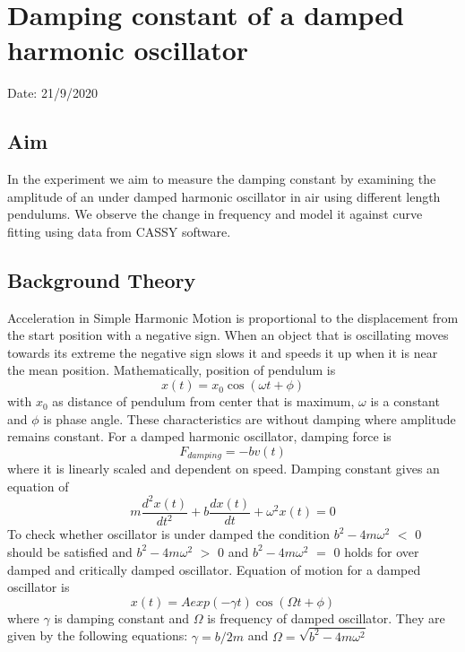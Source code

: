 \chapter{Damping constant of a damped harmonic
oscillator}

Date: 21/9/2020

\section{Aim}

In the experiment we aim to measure the damping constant by examining the amplitude of an under damped harmonic oscillator in air using different length pendulums. We observe the change in frequency and model it against curve fitting using data from CASSY software.    



\section{Background Theory}

Acceleration in Simple Harmonic Motion is proportional to the displacement from the start position with a negative sign. When an object that is oscillating moves towards its extreme the negative sign slows it and speeds it up when it is near the mean position. Mathematically, position of pendulum is
$$ x(t)= x_0 \cos(\omega t + \phi)$$ 
with $x_0$ as distance of pendulum from center that is maximum, $\omega$ is a constant and $\phi$ is phase angle. These characteristics are without damping where amplitude remains constant.
For a damped harmonic oscillator, damping force is 
$$F_{damping} = -b v(t)$$ where it is linearly scaled and dependent on speed. Damping constant gives an equation of 
$$m \frac{d^2 x(t)}{dt^2} + b \frac{dx(t)}{dt} + \omega^2 x(t)=0 $$ 
To check whether oscillator is under damped the condition $b^2 - 4m\omega^2$ $<$ 0 should be satisfied and $b^2 - 4m\omega^2$ $>$ 0 and $b^2 - 4m\omega^2$ $=$ 0 holds for over damped and critically damped oscillator. 
Equation of motion for a damped oscillator is 
$$x(t) = A exp(- \gamma t) \cos(\Omega t +\phi)$$ where $\gamma$ is damping constant and  $\Omega$ is frequency of damped oscillator. They are given by the following equations:
$\gamma= b / 2m$ and $\Omega = \sqrt{b^2 -4m\omega^2}$


